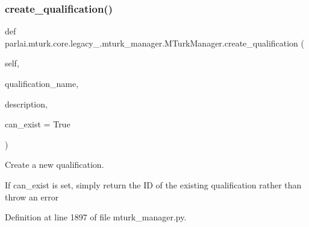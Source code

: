 \subsubsection{\texorpdfstring{create\+\_\+qualification()}{create\_qualification()}}
{\footnotesize\ttfamily def parlai.\+mturk.\+core.\+legacy\+\_.\+mturk\+\_\+manager.\+M\+Turk\+Manager.\+create\+\_\+qualification (\begin{DoxyParamCaption}\item[{}]{self,  }\item[{}]{qualification\+\_\+name,  }\item[{}]{description,  }\item[{}]{can\+\_\+exist = {\ttfamily True} }\end{DoxyParamCaption})}

\begin{DoxyVerb}Create a new qualification.

If can_exist is set, simply return the ID of the existing qualification rather
than throw an error
\end{DoxyVerb}
 

Definition at line 1897 of file mturk\+\_\+manager.\+py.



